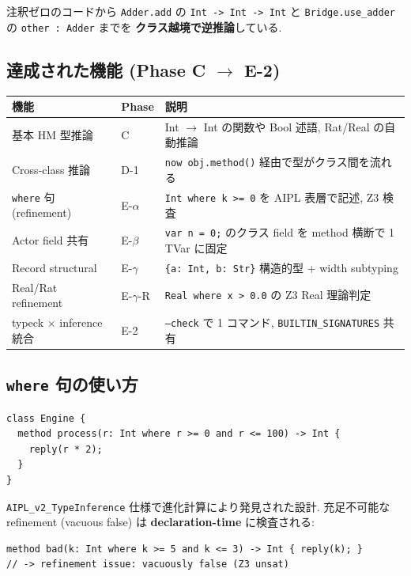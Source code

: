 \documentclass[11pt,a4paper]{article}
\begin{document}
注釈ゼロのコードから \texttt{Adder.add} の \texttt{Int -> Int -> Int} と
\texttt{Bridge.use\_adder} の \texttt{other : Adder} までを
\textbf{クラス越境で逆推論}している.

\subsection{達成された機能 (Phase C $\rightarrow$ E-2)}

\begin{center}
\begin{tabular}{lll}
\toprule
機能 & Phase & 説明 \\
\midrule
基本 HM 型推論 & C & Int $\to$ Int の関数や Bool 述語, Rat/Real の自動推論 \\
Cross-class 推論 & D-1 & \texttt{now obj.method()} 経由で型がクラス間を流れる \\
\texttt{where} 句 (refinement) & E-$\alpha$ & \texttt{Int where k >= 0} を AIPL 表層で記述, Z3 検査 \\
Actor field 共有 & E-$\beta$ & \texttt{var n = 0;} のクラス field を method 横断で 1 TVar に固定 \\
Record structural & E-$\gamma$ & \texttt{\{a: Int, b: Str\}} 構造的型 + width subtyping \\
Real/Rat refinement & E-$\gamma$-R & \texttt{Real where x > 0.0} の Z3 Real 理論判定 \\
typeck $\times$ inference 統合 & E-2 & \texttt{--check} で 1 コマンド, \texttt{BUILTIN\_SIGNATURES} 共有 \\
\bottomrule
\end{tabular}
\end{center}

\subsection{\texttt{where} 句の使い方}

\begin{lstlisting}[language=aipl]
class Engine {
  method process(r: Int where r >= 0 and r <= 100) -> Int {
    reply(r * 2);
  }
}
\end{lstlisting}

\texttt{AIPL\_v2\_TypeInference} 仕様で進化計算により発見された設計.
充足不可能な refinement (vacuous false) は \textbf{declaration-time} に検査される:

\begin{lstlisting}[language=aipl]
method bad(k: Int where k >= 5 and k <= 3) -> Int { reply(k); }
// -> refinement issue: vacuously false (Z3 unsat)
\end{lstlisting}
\end{document}
